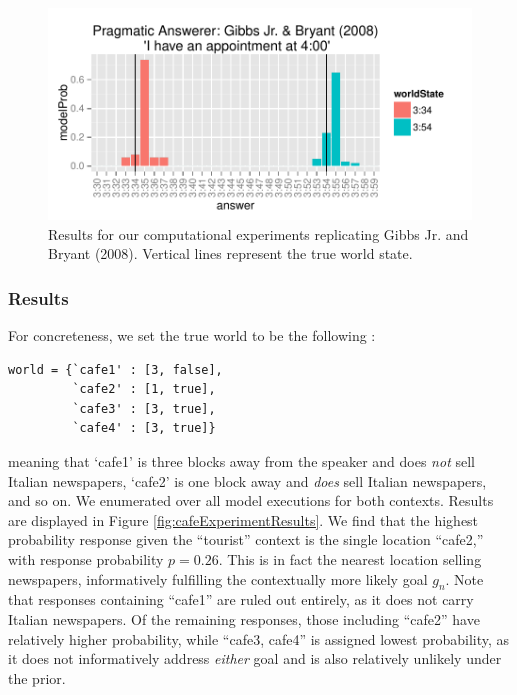 \documentclass[12pt, floatsintext, jou]{apa6}
\begin{document}
 \begin{figure}[t!]
\begin{center}
\includegraphics[scale = 1]{timeExpResults.pdf}
\end{center}
\vspace{-.25cm}
\caption{Results for our computational experiments replicating Gibbs Jr. and Bryant (2008). Vertical lines represent the true world state.}
\label{fig:timeExperimentResults}
\end{figure}

\subsubsection{Results}

For concreteness, we set the true world to be the following :

\begin{lstlisting}
world = {`cafe1' : [3, false],
         `cafe2' : [1, true],
         `cafe3' : [3, true],
         `cafe4' : [3, true]}
\end{lstlisting}
meaning that `cafe1' is three blocks away from the speaker and does \emph{not} sell Italian newspapers, `cafe2' is one block away and \emph{does} sell Italian newspapers, and so on. We enumerated over all model executions for both contexts. Results are displayed in Figure \ref{fig:cafeExperimentResults}. We find that the highest probability response given the ``tourist'' context is the single location ``cafe2,'' with response probability $p = 0.26$. This is in fact the nearest location selling newspapers, informatively fulfilling the contextually more likely goal $g_n$. Note that responses containing ``cafe1'' are ruled out entirely, as it does not carry Italian newspapers. Of the remaining responses, those including ``cafe2'' have relatively higher probability, while ``cafe3, cafe4'' is assigned lowest probability, as it does not informatively address \emph{either} goal and is also relatively unlikely under the prior. 
\end{document}
